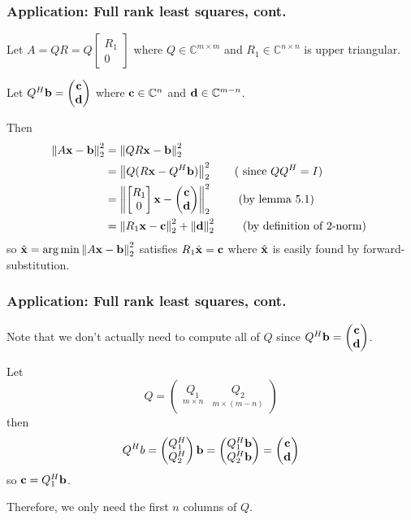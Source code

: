 \documentclass{beamer}
\begin{document}
\begin{frame}\frametitle{Application: Full rank least squares, cont.}

	Let $A=QR=Q\begin{bmatrix} R_1 \\ 0 \end{bmatrix}$ where $Q\in\mathbb{C}^{m\times m}$ and $R_1\in\mathbb{C}^{n\times n}$ is upper triangular.
	
	\vfill
	
	Let $Q^H\mathbf{b} = \begin{pmatrix}\mathbf{c}\\\mathbf{d}\end{pmatrix}$ where $\mathbf{c}\in\mathbb{C}^n$ and $\mathbf{d}\in\mathbb{C}^{m-n}$.
	
	Then 
	\begin{align*}
	 \left\|A\mathbf{x} - \mathbf{b} \right\|_2^2 &= \left\|QR\mathbf{x} - \mathbf{b} \right\|_2^2 \\
	&= \left\|Q(R\mathbf{x}-Q^H\mathbf{b}) \right\|_2^2 \qquad \text{( since $QQ^H = I$)} \\
	&= \left\|\begin{bmatrix} R_1 \\ 0 \end{bmatrix}\mathbf{x} - \begin{pmatrix}\mathbf{c}\\\mathbf{d}\end{pmatrix} \right\|_2^2 \qquad \text{ (by lemma 5.1) }\\
	&= \left\|R_1\mathbf{x} - \mathbf{c} \right\|_2^2 + \left\|\mathbf{d}\right\|_2^2 \qquad \text{ (by definition of 2-norm) }
	\end{align*}
	so $\hat{\mathbf{x}} = \arg\min \left\|A\mathbf{x}-\mathbf{b} \right\|_2^2$ satisfies $R_1\hat{\mathbf{x}} = \mathbf{c}$ where $\hat{\mathbf{x}}$ is easily found by forward-substitution.	
\end{frame}

\begin{frame}\frametitle{Application: Full rank least squares, cont.}
	Note that we don't actually need to compute all of $Q$ since $Q^H\mathbf{b} = \begin{pmatrix}\mathbf{c}\\\mathbf{d}\end{pmatrix}$.
	
	Let 
	\[
		Q = \begin{pmatrix} 
				\underset{m\times n}{Q_1} & \underset{m\times (m-n)}{Q_2} 
			\end{pmatrix}
	\]
	then
	\[
		Q^Hb = \begin{pmatrix}
 					Q_1^H \\
 					Q_2^H
 			   \end{pmatrix} \mathbf{b}
 			 = \begin{pmatrix}
 					Q_1^H \mathbf{b} \\
 					Q_2^H \mathbf{b}
 				\end{pmatrix}
 			= \begin{pmatrix}
 				\mathbf{c} \\ 
 				\mathbf{d}
 			  \end{pmatrix}
	\]
	so $\mathbf{c} = Q_1^H\mathbf{b}$.
	
	\vfill
	
	Therefore, we only need the first $n$ columns of $Q$.
\end{frame}
\end{document}
